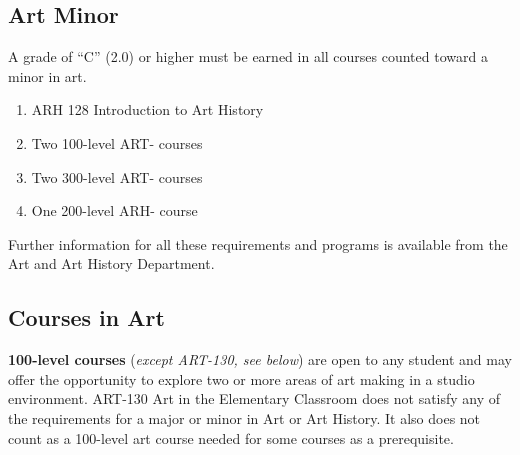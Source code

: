\documentclass[
  letterpaper,
]{scrbook}
\providecommand{\tightlist}{%
  \setlength{\itemsep}{0pt}\setlength{\parskip}{0pt}}
\begin{document}
\subsection{Art Minor}\label{art-minor}

A grade of ``C'' (2.0) or higher must be earned in all courses counted
toward a minor in art.

\begin{enumerate}
\def\labelenumi{\arabic{enumi}.}
\tightlist
\item
  ARH 128 Introduction to Art History
\item
  Two 100-level ART- courses
\item
  Two 300-level ART- courses
\item
  One 200-level ARH- course
\end{enumerate}

Further information for all these requirements and programs is available
from the Art and Art History Department.

\subsection{Courses in Art}\label{courses-in-art}

\textbf{100-level courses} (\emph{except ART-130, see below}) are open
to any student and may offer the opportunity to explore two or more
areas of art making in a studio environment. ART-130 Art in the
Elementary Classroom does not satisfy any of the requirements for a
major or minor in Art or Art History. It also does not count as a
100-level art course needed for some courses as a prerequisite.
\end{document}
